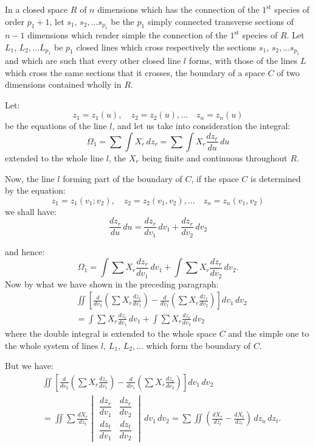 \documentclass{article}
\begin{document}
In a closed space $R$ of $n$ dimensions which has the connection of the $1^{\text{st}}$ species of order $p_{1}+1$, let $s_{1}$, $s_{2},\ldots s_{p_{1}}$ be the $p_{1}$ simply connected transverse sections of $n-1$ dimensions which render simple the connection of the $1^{\text{st}}$ species of $R$. Let $L_{1}$, $L_{2},\ldots L_{p_{1}}$ be $p_{1}$ closed lines which cross respectively the sections $s_{1}$, $s_{2},\ldots s_{p_{1}}$ and which are such that every other closed line $l$ forms, with those of the lines $L$ which cross the same sections that it crosses, the boundary of a space $C$ of two dimensions contained wholly in $R$.

Let:
\[ z_{1} = z_{1}(u), \quad z_{2} = z_{2}(u),\ldots \quad z_{n} = z_{n}(u) \tag{1} \]
be the equations of the line $l$, and let us take into consideration the integral:
\[ \Omega_{1} = \sum \int X_{r}\,dz_{r} = \sum \int X_{r} \frac{dz_{r}}{du}\,du \]
extended to the whole line $l$, the $X_{r}$ being finite and continuous throughout $R$.

Now, the line $l$ forming part of the boundary of $C$, if the space $C$ is determined by the equation:
\[ z_{1} = z_{1}(v_{1}; v_{2}), \quad z_{2} = z_{2}(v_{1}, v_{2}),\ldots \quad z_{n} = z_{n}(v_{1}, v_{2}) \]
we shall have:
\[ \frac{dz_{r}}{du}\,du = \frac{dz_{r}}{dv_{1}}\,dv_{1} + \frac{dz_{r}}{dv_{2}}\,dv_{2} \]

and hence:
\[ \Omega_{1} = \int \sum X_{r} \frac{dz_{r}}{dv_{1}}\,dv_{1} + \int \sum X_{r} \frac{dz_{r}}{dv_{2}}\,dv_{2}. \]
Now by what we have shown in the preceding paragraph:
\[ \begin{aligned} & \iint \left[ \frac{d}{dv_{2}} \left( \sum X_{r} \frac{dz_{r}}{dv_{1}} \right) - \frac{d}{dv_{1}} \left( \sum X_{r} \frac{dz_{r}}{dv_{2}} \right) \right] dv_{1}\,dv_{2} \\ &= \int \sum X_{r} \frac{dz_{r}}{dv_{1}}\,dv_{1} + \int \sum X_{r} \frac{dz_{r}}{dv_{2}}\,dv_{2} \end{aligned} \]
where the double integral is extended to the whole space $C$ and the simple one to the whole system of lines $l$, $L_{1}$, $L_{2},\ldots$ which form the boundary of $C$.

But we have:
\[ \begin{aligned} & \iint \left[ \frac{d}{dv_{2}} \left( \sum X_{r} \frac{dz_{r}}{dv_{1}} \right) - \frac{d}{dv_{1}} \left( \sum X_{r} \frac{dz_{r}}{dv_{2}} \right) \right] dv_{1}\,dv_{2} \\ &= \iint \sum \frac{dX_{r}}{dz_{t}} \begin{vmatrix} \dfrac{dz_{r}}{dv_{1}} & \dfrac{dz_{r}}{dv_{2}} \\ \dfrac{dz_{t}}{dv_{1}} & \dfrac{dz_{t}}{dv_{2}} \end{vmatrix}\,dv_{1}\,dv_{2} = \sum \iint \left( \frac{dX_{r}}{dz_{t}} - \frac{dX_{t}}{dz_{r}} \right)\,dz_{n}\,dz_{t}. \end{aligned} \]
\end{document}
